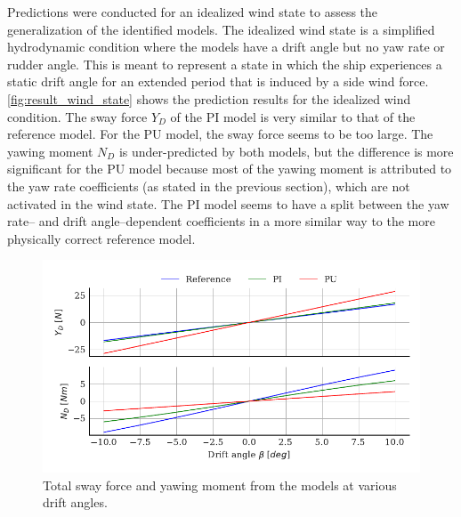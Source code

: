 Predictions were conducted for an idealized wind state to assess the generalization of the identified models. The idealized wind state is a simplified hydrodynamic condition where the models have a drift angle but no yaw rate or rudder angle. This is meant to represent a state in which the ship experiences a static drift angle for an extended period that is induced by a side wind force.
\autoref{fig:result_wind_state} shows the prediction results for the idealized wind condition. The sway force $Y_D$ of the PI model is very similar to that of the reference model. For the PU model, the sway force seems to be too large. The yawing moment $N_D$ is under-predicted by both models, but the difference is more significant for the PU model because most of the yawing moment is attributed to the yaw rate coefficients (as stated in the previous section), which are not activated in the wind state. 
The PI model seems to have a split between the yaw rate-- and drift angle--dependent coefficients in a more similar way to the more physically correct reference model.
\label{sec:wind_state}
\begin{figure}[h!]
    \includegraphics{figures/result_wind_state.forces.pdf}
    \caption{Total sway force and yawing moment from the models at various drift angles.}
    \label{fig:result_wind_state}
\end{figure}